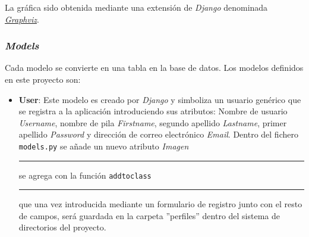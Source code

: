\documentclass[a4paper, 12pt]{book}
\begin{document}
La gr\'afica sido obtenida mediante una extensi\'on de \textit{Django} denominada 
\href{https://code.djangoproject.com/wiki/DjangoGraphviz}{\textit{Graphviz}}.

\subsubsection{\textit{Models}} 
\label{sec:models}
Cada modelo se convierte en una tabla en la base de datos. Los modelos definidos en este proyecto son:

\begin{itemize}
  \item {\bfseries User}: Este modelo es creado por \textit{Django} y simboliza un usuario gen\'erico que se registra a la aplicaci\'on introduciendo sus 
  atributos: Nombre de usuario \textit{Username}, nombre de pila \textit{Firstname}, segundo apellido \textit{Lastname}, primer apellido \textit{Password} 
  y direcci\'on de correo electr\'onico \textit{Email}. Dentro del fichero \texttt{models.py} se a\~nade un nuevo atributo \textit{Imagen} 
  \rule[1mm]{4mm}{0.1mm}se agrega con la funci\'on \texttt{addtoclass}\rule[1mm]{4mm}{0.1mm} que una vez introducida mediante un formulario de registro 
  junto con el resto de campos, ser\'a guardada en la carpeta ''perfiles'' dentro del sistema de directorios del proyecto. 
  

\end{itemize}
\end{document}
